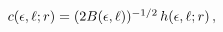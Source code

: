 $\mathop{c\/}\nolimits\!\left(\epsilon,\ell;r\right)=(2B(\epsilon,\ell))^{-1/2}%
\mathop{h\/}\nolimits\!\left(\epsilon,\ell;r\right),$